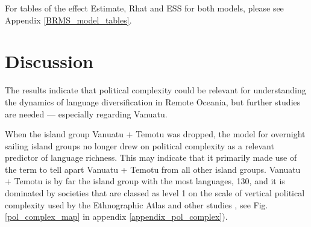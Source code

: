 \documentclass[12pt,letterpaper]{article}
\begin{document}
For tables of the effect Estimate, Rhat and ESS for both models, please see Appendix \ref{BRMS_model_tables}.









\FloatBarrier
\section{Discussion}
\label{pol_study_discisson}
The results indicate that political complexity could be relevant for understanding the dynamics of language diversification in Remote Oceania, but further studies are needed --- especially regarding Vanuatu. 

When the island group Vanuatu + Temotu was dropped, the model for overnight sailing island groups no longer drew on political complexity as a relevant predictor of language richness. This may indicate that it primarily made use of the term to tell apart Vanuatu + Temotu from all other island groups. Vanuatu + Temotu is by far the island group with the most languages, 130, and it is dominated by societies that are classed as level 1 on the scale of vertical political complexity used by the Ethnographic Atlas \citep{gray1998ethnographic} and other studies \citep{watts_2018}, see Fig. \ref{pol_complex_map} in appendix \ref{appendix_pol_complex}).
\end{document}
